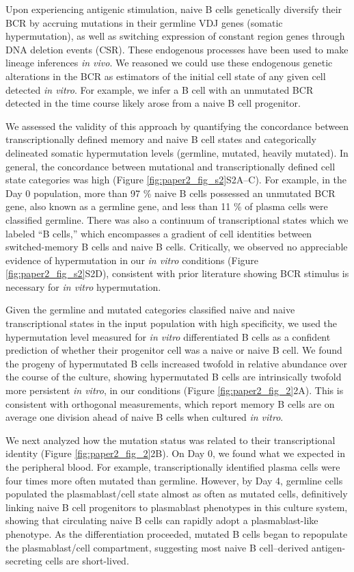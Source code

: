 Upon experiencing antigenic stimulation, naive B cells genetically diversify their BCR by accruing mutations in their germline VDJ genes (somatic hypermutation), as well as switching expression of constant region genes through DNA deletion events (CSR). These endogenous processes have been used to make lineage inferences \textit{in vivo}\cite{horns_lineage_2016}. We reasoned we could use these endogenous genetic alterations in the BCR as estimators of the initial cell state of any given cell detected \textit{in vitro}. For example, we infer a B cell with an unmutated BCR detected in the time course likely arose from a naive B cell progenitor.

We assessed the validity of this approach by quantifying the concordance between transcriptionally defined memory and naive B cell states and categorically delineated somatic hypermutation levels (germline, mutated, heavily mutated). In general, the concordance between mutational and transcriptionally defined cell state categories was high (Figure \ref{fig:paper2_fig_s2}S2A–C). For example, in the Day 0 population, more than 97 \% naive B cells possessed an unmutated BCR gene, also known as a germline gene, and less than 11 \% of plasma cells were classified germline. There was also a continuum of transcriptional states which we labeled “B cells,” which encompasses a gradient of cell identities between switched-memory B cells and naive B cells. Critically, we observed no appreciable evidence of hypermutation in our \textit{in vitro} conditions (Figure \ref{fig:paper2_fig_s2}S2D), consistent with prior literature showing BCR stimulus is necessary for \textit{in vitro} hypermutation\cite{bergthorsdottir_signals_2001}.


Given the germline and mutated categories classified naive and naive transcriptional states in the input population with high specificity, we used the hypermutation level measured for \textit{in vitro} differentiated B cells as a confident prediction of whether their progenitor cell was a naive or naive B cell. We found the progeny of hypermutated B cells increased twofold in relative abundance over the course of the culture, showing hypermutated B cells are intrinsically twofold more persistent \textit{in vitro}, in our conditions (Figure \ref{fig:paper2_fig_2}2A). This is consistent with orthogonal measurements, which report memory B cells are on average one division ahead of naive B cells when cultured \textit{in vitro}\cite{tangye_intrinsic_2003}.


We next analyzed how the mutation status was related to their transcriptional identity (Figure \ref{fig:paper2_fig_2}2B). On Day 0, we found what we expected in the peripheral blood. For example, transcriptionally identified plasma cells were four times more often mutated than germline. However, by Day 4, germline cells populated the plasmablast/cell state almost as often as mutated cells, definitively linking naive B cell progenitors to plasmablast phenotypes in this culture system, showing that circulating naive B cells can rapidly adopt a plasmablast-like phenotype. As the differentiation proceeded, mutated B cells began to repopulate the plasmablast/cell compartment, suggesting most naive B cell–derived antigen-secreting cells are short-lived.


